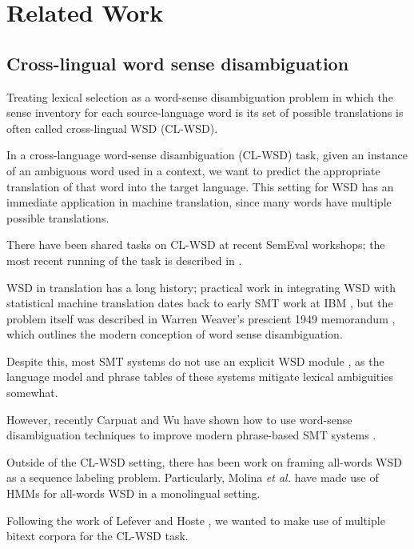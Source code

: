\section{Related Work}

\subsection{Cross-lingual word sense disambiguation}
Treating lexical selection as a word-sense disambiguation problem in which the
sense inventory for each source-language word is its set of possible
translations is often called cross-lingual WSD (CL-WSD).

In a cross-language word-sense disambiguation (CL-WSD) task, given an
instance of an ambiguous word used in a context, we want to predict the
appropriate translation of that word into the target language. This setting for
WSD has an immediate application in machine translation, since many words have
multiple possible translations.

There have been shared tasks on CL-WSD at recent SemEval workshops; the most
recent running of the task is described in \cite{task10}.

WSD in translation has a long history; practical work in integrating
WSD with statistical machine translation dates back to early SMT work at IBM
\cite{Brown91word-sensedisambiguation}, but the problem itself was described in
Warren Weaver's prescient 1949 memorandum \cite{weavermemo}, which outlines the
modern conception of word sense disambiguation.

Despite this, most SMT systems do not use an explicit WSD module
\cite{wsdchap3}, as the language model and phrase tables of these systems
mitigate lexical ambiguities somewhat.



However, recently Carpuat and Wu have shown how to use word-sense
disambiguation techniques to improve modern phrase-based SMT systems
\cite{carpuatpsd}.
\cite{carpuat2008evaluation}
\cite{carpuat-wu:2007:EMNLP-CoNLL2007}


Outside of the CL-WSD setting, there has been work on framing all-words WSD as
a sequence labeling problem. Particularly, Molina \textit{et al.}
 have made use of HMMs for all-words
WSD in a monolingual setting.

Following the work of Lefever and Hoste
, we wanted to make use of
multiple bitext corpora for the CL-WSD task.

